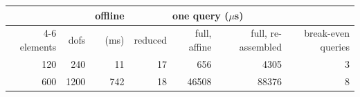 \begin{tabular}{rrrrrrr}
\toprule
 & & offline & \multicolumn{3}{c}{one query ($\mu$s)} & \\
\cmidrule(lr){4-6}
elements & dofs & (ms) & reduced & full, affine & full, re-assembled & break-even queries \\
\midrule
120 & 240 & 11 & 17 & 656 & 4305 & 3 \\
600 & 1200 & 742 & 18 & 46508 & 88376 & 8 \\
\bottomrule
\end{tabular}
